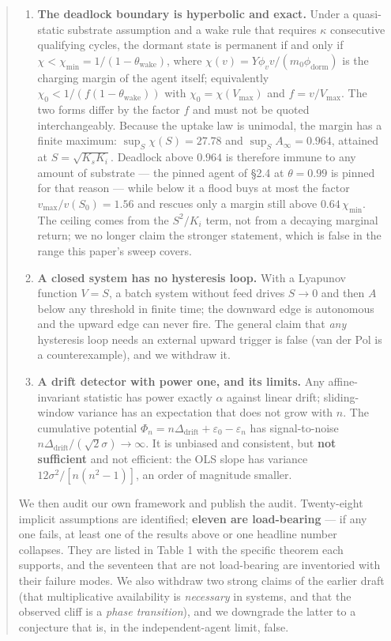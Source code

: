 \documentclass[11pt,a4paper]{article}
\providecommand{\tightlist}{\setlength{\itemsep}{0pt}\setlength{\parskip}{0pt}}
\begin{document}
\begin{abstract}
\begin{enumerate}
\def\labelenumi{\arabic{enumi}.}
\tightlist
\item
  \textbf{The deadlock boundary is hyperbolic and exact.} Under a quasi-static
  substrate assumption and a wake rule that requires \(\kappa\) consecutive
  qualifying cycles, the dormant state is permanent if and only if
  \(\chi<\chi_{\min}=1/(1-\theta_{\mathrm{wake}})\), where
  \(\chi(v)=Y\phi_v v/(m_0\phi_{\mathrm{dorm}})\) is the charging margin of the
  agent itself; equivalently \(\chi_0<1/(f(1-\theta_{\mathrm{wake}}))\) with
  \(\chi_0=\chi(V_{\max})\) and \(f=v/V_{\max}\). The two forms differ by the factor
  \(f\) and must not be quoted interchangeably. Because the uptake law is unimodal,
  the margin has a finite maximum: \(\sup_S\chi(S)=27.78\) and
  \(\sup_S A_\infty=0.964\), attained at \(S=\sqrt{K_sK_i}\). Deadlock above \(0.964\)
  is therefore immune to any amount of substrate --- the pinned agent of §2.4 at
  \(\theta=0.99\) is pinned for that reason --- while below it a flood buys at most
  the factor \(v_{\max}/v(S_0)=1.56\) and rescues only a margin still above
  \(0.64\,\chi_{\min}\). The ceiling comes from the \(S^2/K_i\) term, not from a
  decaying marginal return; we no longer claim the stronger statement, which is
  false in the range this paper's sweep covers.
\item
  \textbf{A closed system has no hysteresis loop.} With a Lyapunov function
  \(V=S\), a batch system without feed drives \(S\to0\) and then \(A\) below any
  threshold in finite time; the downward edge is autonomous and the upward edge
  can never fire. The general claim that \emph{any} hysteresis loop needs an
  external upward trigger is false (van der Pol is a counterexample), and we
  withdraw it.
\item
  \textbf{A drift detector with power one, and its limits.} Any affine-invariant
  statistic has power exactly \(\alpha\) against linear drift; sliding-window
  variance has an expectation that does not grow with \(n\). The cumulative
  potential
  \(\Phi_n=n\Delta_{\mathrm{drift}}+\varepsilon_0-\varepsilon_n\) has
  signal-to-noise \(n\Delta_{\mathrm{drift}}/(\sqrt2\sigma)\to\infty\). It is
  unbiased and consistent, but \textbf{not sufficient} and not efficient: the OLS
  slope has variance \(12\sigma^2/[n(n^2-1)]\), an order of magnitude smaller.
\end{enumerate}

We then audit our own framework and publish the audit. Twenty-eight implicit
assumptions are identified; \textbf{eleven are load-bearing} --- if any one fails, at
least one of the results above or one headline number collapses. They are listed
in Table 1 with the specific theorem each supports, and the seventeen that are
not load-bearing are inventoried with their failure modes. We also withdraw two strong
claims of the earlier draft (that multiplicative availability is \emph{necessary} in
systems, and that the observed cliff is a \emph{phase transition}), and we downgrade
the latter to a conjecture that is, in the independent-agent limit, false.


\end{abstract}
\end{document}
